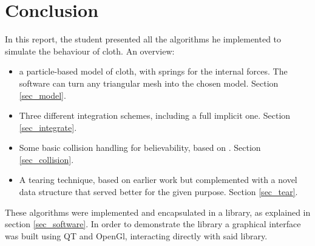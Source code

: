 
\ifx\isEmbedded\undefined

\graphicspath{{../img/}}

\fi

\section{Conclusion}
In this report, the student presented all the algorithms he implemented to simulate the behaviour of cloth. An overview:
\begin{itemize}
\item a particle-based model of cloth, with springs for the internal forces. The software can turn any triangular mesh into the chosen model. Section \ref{sec_model}.
\item Three different integration schemes, including a full implicit one. Section \ref{sec_integrate}.
\item Some basic collision handling for believability, based on \cite{position_based_dyn}. Section \ref{sec_collision}.
\item A tearing technique, based on earlier work but complemented with a novel data structure that served better for the given purpose. Section \ref{sec_tear}.
\end{itemize}
These algorithms were implemented and encapsulated in a library, as explained in section \ref{sec_software}. In order to demonstrate the library a graphical interface was built using QT and OpenGl, interacting directly with said library.

\ifx\isEmbedded\undefined


\pagebreak

\fi